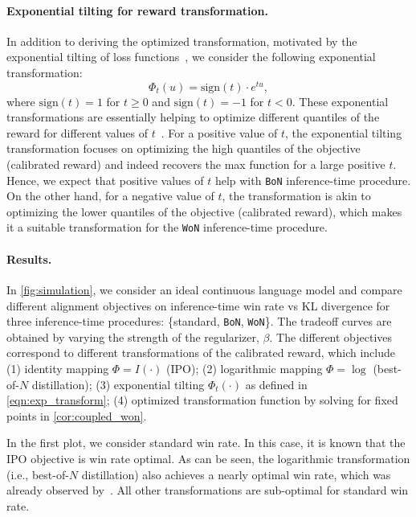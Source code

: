 \documentclass{article}
\newcommand{\reg}{\beta}
\newcommand{\bofn}{\texttt{BoN}\xspace}
\newcommand{\wofn}{\texttt{WoN}\xspace}
\begin{document}
\paragraph{Exponential tilting for reward transformation.} In addition to deriving the optimized transformation, motivated by the exponential tilting of loss functions~\citep{li2021tilted, li2023tilted}, we consider the following exponential transformation: %
%
\begin{equation}
    \Phi_t(u) = \text{sign}(t) \cdot e^{t u},
\label{eqn:exp_transform}
\end{equation}
where $\text{sign}(t) = 1$ for $t\geq 0$ and $\text{sign}(t) = -1$ for $t<0.$
These exponential transformations are essentially helping to optimize different quantiles of the reward for different values of $t$~\citep{li2023tilted}. For a positive value of $t$, the exponential tilting transformation focuses on optimizing the high quantiles of the objective (calibrated reward) and indeed recovers the max function for a large positive $t$. Hence, we expect that positive values of $t$ help with \bofn inference-time procedure. On the other hand, for a negative value of $t$, the transformation is akin to optimizing the lower quantiles of the objective (calibrated reward), which makes it a suitable transformation for the \wofn inference-time procedure.



\paragraph{Results.} 
In \cref{fig:simulation}, we consider 
an ideal continuous language model and compare different alignment objectives on 
inference-time win rate vs KL divergence for three inference-time procedures: \{standard, \bofn, \wofn\}. The tradeoff curves are obtained by varying the strength of the regularizer, $\reg$.
The different objectives correspond to different transformations of the calibrated reward, which include (1) identity mapping  $\Phi =I(\cdot)$ (IPO); (2) logarithmic mapping $\Phi = \log$ (best-of-$N$ distillation); (3) exponential tilting $\Phi_t(\cdot)$ as defined in \cref{eqn:exp_transform}; (4) optimized transformation function by solving for fixed points in \cref{cor:coupled_won}.

In the first plot, we consider standard win rate. In this case, it is known that the IPO objective is win rate optimal. As can be seen, the logarithmic transformation (i.e., best-of-$N$ distillation) also achieves a nearly optimal win rate, which was already observed by~\citet{yang2024asymptotics, gui2024bonbonalignmentlargelanguage}. All other transformations are sub-optimal for standard win rate.
\end{document}
